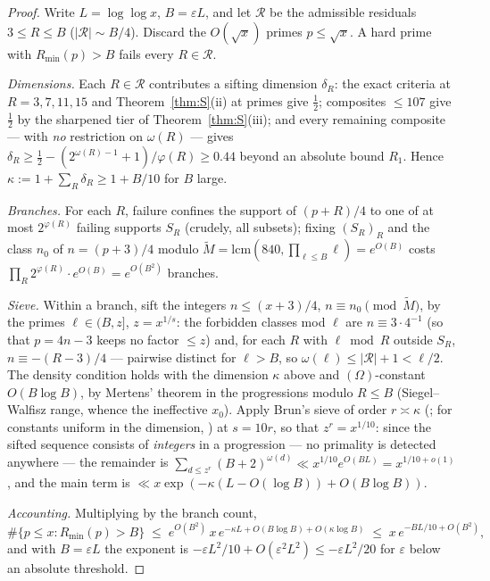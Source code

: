 \documentclass[11pt]{article}
\theoremstyle{plain}
\theoremstyle{remark}
\theoremstyle{plain}
\numberwithin{equation}{section}
\begin{document}
\begin{proof}
Write $L = \log\log x$, $B = \varepsilon L$, and let $\mathcal{R}$ be
the admissible residuals $3 \le R \le B$
($|\mathcal{R}| \sim B/4$). Discard the $O(\sqrt x)$ primes
$p \le \sqrt x$. A hard prime with $R_{\min}(p) > B$ fails every
$R \in \mathcal{R}$.

\emph{Dimensions.} Each $R \in \mathcal{R}$ contributes a sifting
dimension $\delta_R$: the exact criteria at $R = 3, 7, 11, 15$ and
Theorem~\ref{thm:S}(ii) at primes give $\tfrac12$; composites
$\le 107$ give $\tfrac12$ by the sharpened tier of
Theorem~\ref{thm:S}(iii); and every remaining composite --- with
\emph{no} restriction on $\omega(R)$ --- gives
$\delta_R \ge \tfrac12 - (2^{\omega(R)-1}+1)/\varphi(R) \ge 0.44$
beyond an absolute bound $R_1$. Hence
$\kappa := 1 + \sum_{R} \delta_R \ge 1 + B/10$ for $B$ large.

\emph{Branches.} For each $R$, failure confines the support of
$(p+R)/4$ to one of at most $2^{\varphi(R)}$ failing supports
$S_R$ (crudely, all subsets); fixing $(S_R)_R$
and the class $n_0$ of $n = (p+3)/4$ modulo
$\widetilde M = \mathrm{lcm}(840, \prod_{\ell \le B} \ell) =
e^{O(B)}$ costs $\prod_R 2^{\varphi(R)} \cdot e^{O(B)} = e^{O(B^2)}$
branches.

\emph{Sieve.} Within a branch, sift the integers
$n \le (x+3)/4$, $n \equiv n_0 \pmod{\widetilde M}$, by the primes
$\ell \in (B, z]$, $z = x^{1/s}$: the forbidden classes mod $\ell$
are $n \equiv 3 \cdot 4^{-1}$ (so that $p = 4n-3$ keeps no factor
$\le z$) and, for each $R$ with $\ell \bmod R$ outside $S_R$,
$n \equiv -(R-3)/4$ --- pairwise distinct for $\ell > B$, so
$\omega(\ell) \le |\mathcal{R}| + 1 < \ell/2$. The density
condition holds with the dimension $\kappa$ above and
$(\Omega)$-constant $O(B \log B)$, by Mertens' theorem in the
progressions modulo $R \le B$ (Siegel--Walfisz range, whence the
ineffective $x_0$). Apply Brun's sieve of order $r \asymp \kappa$
(\cite[Ch.~2]{HalberstamRichert}; for constants uniform in the
dimension, \cite[Thm.~6.9]{FriedlanderIwaniec}) at $s = 10r$, so
that $z^r = x^{1/10}$: since the sifted sequence consists of
\emph{integers} in a progression --- no primality is detected
anywhere --- the remainder is
$\sum_{d \le z^r} (B+2)^{\omega(d)} \ll x^{1/10} e^{O(BL)} =
x^{1/10 + o(1)}$, and the main term is
$\ll x \exp(-\kappa (L - O(\log B)) + O(B\log B))$.

\emph{Accounting.} Multiplying by the branch count,
\[
  \#\{p \le x : R_{\min}(p) > B\}
  \;\le\; e^{O(B^2)}\, x\, e^{-\kappa L + O(B \log B) +
  O(\kappa \log B)}
  \;\le\; x\,e^{-BL/10 + O(B^2)},
\]
and with $B = \varepsilon L$ the exponent is
$-\varepsilon L^2/10 + O(\varepsilon^2 L^2) \le
-\varepsilon L^2/20$ for $\varepsilon$ below an absolute threshold.
\end{proof}
\end{document}
